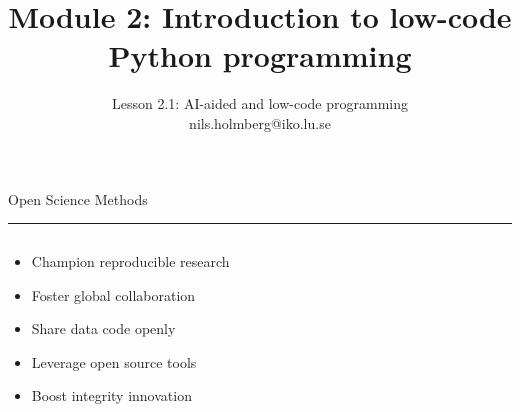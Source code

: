 \documentclass[aspectratio=169]{beamer}
\title{Module 2: Introduction to low-code Python programming}
\subtitle{Lesson 2.1: AI-aided and low-code programming \\[0.8em]nils.holmberg@iko.lu.se}
\author{}
\newcommand{\TitleFont}{\rmfamily}
\begin{document}
\begin{frame}[plain]
  \titlepage
\end{frame}
\setcounter{framenumber}{0} %

\begin{frame}[t]{}
  \vspace*{0.5cm}
  {\TitleFont\fontsize{18}{22}\selectfont\color{LUBronze}Open Science Methods\par}
  \vspace{0.3em}
  {\color{LUBronze}\rule{\linewidth}{0.8pt}}\par
  \vspace{0.2cm}
  \begin{columns}[t]
    \begin{column}[t]{0.4\textwidth}
      \vspace*{0pt}
      \begin{itemize}\setlength\itemsep{0.65em}
        \item Champion reproducible research
        \item Foster global collaboration
        \item Share data code openly
        \item Leverage open source tools
        \item Boost integrity innovation
      \end{itemize}
    \end{column}
  \end{columns}
\end{frame}
\end{document}
